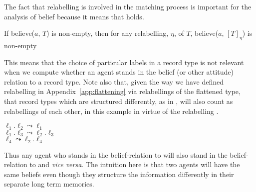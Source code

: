 The fact that
relabelling is involved in the matching process is important for the
analysis of belief because
it means that \nexteg{} holds.
\begin{ex} 
If believe($a$, $T$) is non-empty, then for any relabelling, $\eta$,
of $T$, believe($a$, $[T]_{\eta}$) is non-empty 
\end{ex} 
This means that the choice of particular labels in a record type is
not relevant when we compute whether an agent stands in the belief (or
other attitude)
relation to a record type.  Note also that, given the way we have
defined relabelling in Appendix~\ref{app:flattening} via relabellings
of the flattened type, that record
types which are structured differently, as in , will also
count as relabellings of each other, in this example in virtue of the relabelling .
\begin{ex} 
\begin{subex} 
 
\item {} 
 
\item {}

\item  $\ell_1.\ell_2\leadsto\ell_1$\\
$\ell_1.\ell_3\leadsto\ell_2.\ell_3$\\
$\ell_4\leadsto\ell_2.\ell_4$
 
\end{subex} 
   
\end{ex} 
Thus any agent who stands in the belief-relation to  will
also stand in the belief-relation to  and \textit{vice
  versa}.  The intuition here is that two agents will have the same
beliefs even though they structure the information differently in
their separate long term memories.

